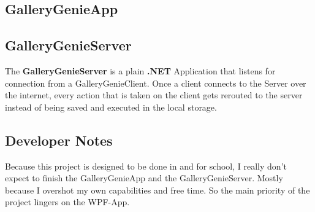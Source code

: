 \documentclass[a4paper,12pt]{article}
\newcommand{\imgal}{GalleryGenie}
\newcommand{\imgalapp}{\color{client}\imgal App\color{black}}
\newcommand{\imgalclient}{\color{client}\imgal Client\color{black}}
\newcommand{\imgalserver}{\color{server}\imgal Server\color{black}}
\begin{document}
\subsection{\imgalapp}

\subsection{\imgalserver}
The \textbf{\imgalserver{}} is a plain \textbf{.NET} Application that listens for connection from a \imgalclient{}. Once a client connects to the Server over the internet, every action that is taken on the client gets rerouted to the server instead of being saved and executed in the local storage.
\subsection{Developer Notes}
Because this project is designed to be done in and for school, I really don't expect to finish the \imgalapp{} and the \imgalserver{}. Mostly because I overshot my own capabilities and free time. So the main priority of the project lingers on the WPF-App.
\end{document}

